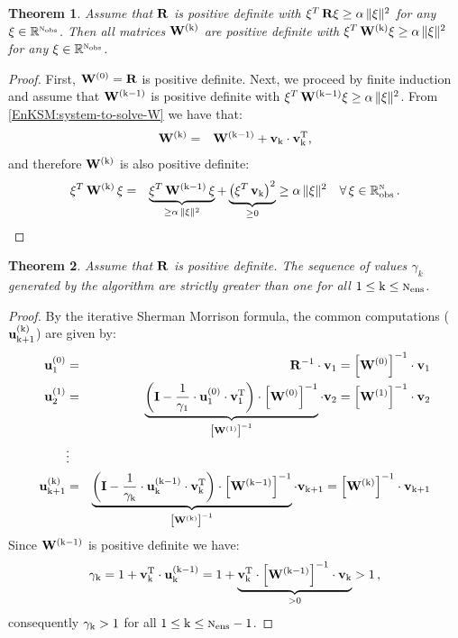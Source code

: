 \documentclass[12pt]{article}
\newtheorem{theorem}{Theorem}
\newcommand{\inv}[1]{\left[{\bf W^{(\rm #1)}}\right]^{\rm -1}}
\newcommand{\Nobs}{\textsc{n}_{{\rm obs}}}
\newcommand{\Nens}{\textsc{n}_{{\rm ens}}}
\newcommand{\R}{{\bf R}}
\renewcommand{\u}[2]{{\bf u}_{\rm #1}^{(\rm #2)}}
\newcommand{\W}[1]{{{\bf W}^{\left ( {\rm #1} \right )}}}
\renewcommand{\v}[1]{{\bf v}_{{\rm #1}}}
\newcommand{\invS}[1]{ {#1^{-1}}}
\renewcommand{\k}{{\rm k}}
\begin{document}
 
\begin{theorem}
\label{Theo:sequence-positive}
Assume that $\R$ is positive definite with $\xi^T\, \R \xi \ge \alpha\, \Vert \xi \Vert^2$ for any $\xi \in \mathbb{R}^{\Nobs}$.
Then all matrices $\W{\k}$ are positive definite with $\xi^T\, \W{\k} \xi \ge \alpha\, \Vert \xi \Vert^2$ for any $\xi \in \mathbb{R}^{\Nobs}$.
\end{theorem} 
 
\begin{proof}
First, $\W{0} = \R$ is positive definite. Next, we proceed by finite induction and assume that $\W{\k-1}$ is positive definite
with $\xi^T\, \W{\k-1} \xi \ge \alpha\, \Vert \xi \Vert^2$.
From \eqref{EnKSM:system-to-solve-W} we have that:
\begin{eqnarray*}
\displaystyle \W{\k} &=& \W{\k-1}+\v{\k} \cdot \v{\k}^{\rm T},
\end{eqnarray*}
and therefore $\W{\k}$ is also positive definite:
\begin{eqnarray*}
\xi^T\, \W{\k} \, \xi &=& \underbrace{ \xi^T\,\W{\k-1} \, \xi }_{ \ge \alpha\, \Vert \xi \Vert^2}+ \underbrace{ \left( \xi^T\, \v{\k} \right)^2}_{\ge 0}  \ge \alpha\, \Vert \xi \Vert^2 \quad \forall \, \xi\in \mathbb{R}^\Nobs\,.
\end{eqnarray*}
\end{proof} 
 
\begin{theorem}
\label{Theo:non-zero-gamma-values}
Assume that $\R$ is positive definite. The sequence of values $\gamma_{k}$ generated by the algorithm are strictly greater than one for all $1\le \k \le \Nens$.
\end{theorem}


\begin{proof}
By the iterative Sherman Morrison formula, the common computations ($\u{\k+1}{\k}$) are given by:
\begin{eqnarray}
\displaystyle  \nonumber
\u{\rm 1}{0} &=& \invS{\R} \cdot \v{1} = \left[ \W{0}\right ]^{-1} \cdot \v{1} \\ \nonumber
\u{\rm 2}{1} &=&  \underbrace{\left( {\bf I}-\frac{1}{\gamma_{1}} \cdot  \u{1}{0} \cdot \v{1}^{\rm T} \right ) \cdot \left[ \W{0} \right]^{-1}}_{\left [\W{1} \right ]^{-1}} \cdot \v{2} = \left[ \W{1}\right ]^{-1} \cdot {\v{2}} \\ \nonumber
& \vdots & \\ \label{EnKSM:inverse-iteration-k}
\u{\k+1}{\k} &=&  \underbrace{\left( {\bf I}-\frac{1}{\gamma_{\k}} \cdot \u{\k}{\k-1} \cdot \v{\k}^{\rm T} \right ) \cdot \left[ \W{\k-1}\right ]^{-1}}_{\left [\W{\k} \right ]^{-1}} \cdot \v{\k+1} = \left[ \W{\k}\right ]^{-1} \cdot {\v{\k+1}} 
\end{eqnarray}
Since $\W{\k-1}$ is positive definite we have:
\begin{eqnarray*}
\displaystyle \gamma_{\k} = 1+\v{\k}^{\rm T} \cdot \u{\k}{\k-1} =  1+ \underbrace{\v{\k}^{\rm T} \cdot \inv{k-1} \cdot \v{\k}}_{>0} > 1\, ,
\end{eqnarray*}
consequently $\gamma_{\k}>1$ for all $1 \le \k \le \Nens-1$.
\end{proof}
\end{document}
